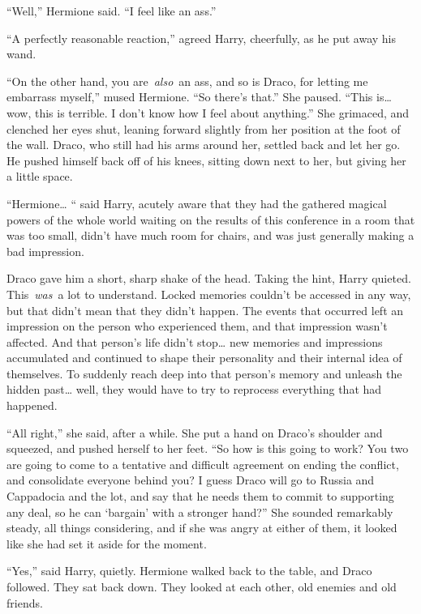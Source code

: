 \mybreak

``Well,'' Hermione said. ``I feel like an ass.''

``A perfectly reasonable reaction,'' agreed Harry, cheerfully, as he put
away his wand.

``On the other hand, you are~\emph{also}~an ass, and so is Draco, for
letting me embarrass myself,'' mused Hermione. ``So there's that.'' She
paused. ``This is\ldots{} wow, this is terrible. I don't know how I feel
about anything.'' She grimaced, and clenched her eyes shut, leaning
forward slightly from her position at the foot of the wall. Draco, who
still had his arms around her, settled back and let her go. He pushed
himself back off of his knees, sitting down next to her, but giving her
a little space.

``Hermione\ldots{} `` said Harry, acutely aware that they had the
gathered magical powers of the whole world waiting on the results of
this conference in a room that was too small, didn't have much room for
chairs, and was just generally making a bad impression.

Draco gave him a short, sharp shake of the head. Taking the hint, Harry
quieted. This~\emph{was}~a lot to understand. Locked memories couldn't
be accessed in any way, but that didn't mean that they didn't happen.
The events that occurred left an impression on the person who
experienced them, and that impression wasn't affected. And that person's
life didn't stop\ldots{} new memories and impressions accumulated and
continued to shape their personality and their internal idea of
themselves. To suddenly reach deep into that person's memory and unleash
the hidden past\ldots{} well, they would have to try to reprocess
everything that had happened.

``All right,'' she said, after a while. She put a hand on Draco's
shoulder and squeezed, and pushed herself to her feet. ``So how is this
going to work? You two are going to come to a tentative and difficult
agreement on ending the conflict, and consolidate everyone behind you? I
guess Draco will go to Russia and Cappadocia and the lot, and say that
he needs them to commit to supporting any deal, so he can `bargain' with
a stronger hand?'' She sounded remarkably steady, all things
considering, and if she was angry at either of them, it looked like she
had set it aside for the moment.

``Yes,'' said Harry, quietly. Hermione walked back to the table, and
Draco followed. They sat back down. They looked at each other, old
enemies and old friends.

